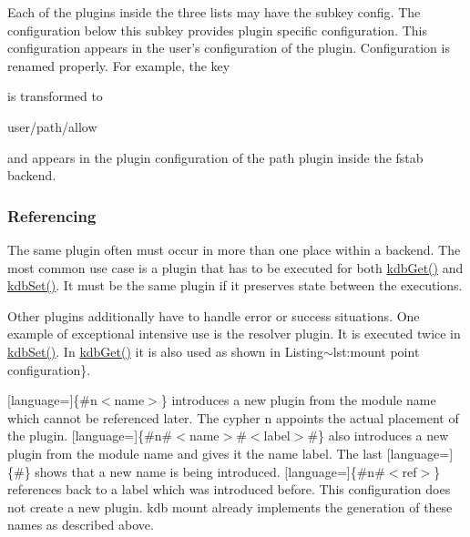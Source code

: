 Each of the plugins inside the three lists may have the subkey {\ttfamily config}. The configuration below this subkey provides plugin specific configuration. This configuration appears in the user's configuration of the plugin. Configuration is renamed properly. For example, the key 


is transformed to \begin{DoxyVerb}    user/path/allow
\end{DoxyVerb}


and appears in the plugin configuration of the path plugin inside the fstab backend.

\subsubsection*{Referencing}

The same plugin often must occur in more than one place within a backend. The most common use case is a plugin that has to be executed for both {\ttfamily \hyperlink{group__kdb_ga28e385fd9cb7ccfe0b2f1ed2f62453a1}{kdb\+Get()}} and {\ttfamily \hyperlink{group__kdb_ga11436b058408f83d303ca5e996832bcf}{kdb\+Set()}}. It must be the same plugin if it preserves state between the executions.

Other plugins additionally have to handle error or success situations. One example of exceptional intensive use is the resolver plugin. It is executed twice in {\ttfamily \hyperlink{group__kdb_ga11436b058408f83d303ca5e996832bcf}{kdb\+Set()}}. In {\ttfamily \hyperlink{group__kdb_ga28e385fd9cb7ccfe0b2f1ed2f62453a1}{kdb\+Get()}} it is also used as shown in Listing$\sim$lst\+:mount point configuration\}.

\mbox{[}language=\mbox{]}\{\#n$<$name$>$\} introduces a new plugin from the module {\ttfamily name} which cannot be referenced later. The cypher {\ttfamily n} appoints the actual placement of the plugin. \mbox{[}language=\mbox{]}\{\#n\#$<$name$>$\#$<$label$>$\#\} also introduces a new plugin from the module {\ttfamily name} and gives it the name {\ttfamily label}. The last \mbox{[}language=\mbox{]}\{\#\} shows that a new name is being introduced. \mbox{[}language=\mbox{]}\{\#n\#$<$ref$>$\} references back to a label which was introduced before. This configuration does not create a new plugin. {\ttfamily kdb mount} already implements the generation of these names as described above.

